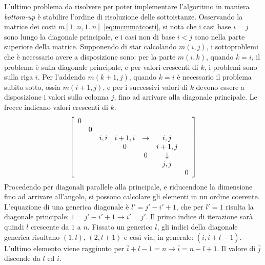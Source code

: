 L'ultimo problema da risolvere per poter implementare l'algoritmo in maniera \emph{bottom-up} è stabilire l'ordine di risoluzione delle sottoistanze.
Osservando la matrice dei costi $m[1..n, 1..n]$ \ref{eq:mcmmatcosti}, si nota che i casi base $i=j$ sono lungo la diagonale principale, e i casi non di base $i<j$ sono nella parte superiore della matrice.
Supponendo di star calcolando $m(i,j)$, i sottoproblemi che è necessario avere a disposizione sono: per la parte $m(i,k)$, quando $k=i$, il problema è sulla diagonale principale, e per valori crescenti di $k$, i problemi sono sulla riga $i$. Per l'addendo $m(k+1,j)$, quando $k=i$ è necessario il problema subito sotto, ossia $m(i+1,j)$, e per i successivi valori di $k$ devono essere a disposizione i valori sulla colonna $j$, fino ad arrivare alla diagonale principale. Le frecce indicano valori crescenti di $k$.
\begin{equation}
    \left[ 
        \begin{array}[H]{ccccccc}
            0 & & & & & & \\
            & 0 & & & & & \\
            & & i,i & i+1,i & \rightarrow & i,j & \\
            & & & 0 & & i+1,j & \\
            & & & & 0 & \downarrow & \\
            & & & & & j,j & \\
            & & & & & & 0\\
        \end{array}
    \right]
    \label{eq:mcmmatcosti}
\end{equation}
Procedendo per diagonali parallele alla principale, e riducendone la dimensione fino ad arrivare all'angolo, si possono calcolare gli elementi in un ordine coerente.
L'equazione di una generica diagonale è $l'=j'-i'+1$, che per $l'=1$ risulta la diagonale principale: $1=j'-i'+1 \rightarrow i'=j'$.
Il primo indice di iterazione sarà quindi $l$ crescente da $1$ a $n$. Fissato un generico $l$, gli indici della diagonale generica risultano
$(1,l)$, $(2,l+1)$ e così via, in generale: $(\bar{i}, \bar{i}+l-1)$. L'ultimo elemento viene raggiunto per $\bar{i}+l-1=n \rightarrow \bar{i}=n-l+1$.
Il valore di $\bar{j}$ discende da $l$ ed $\bar{i}$.

